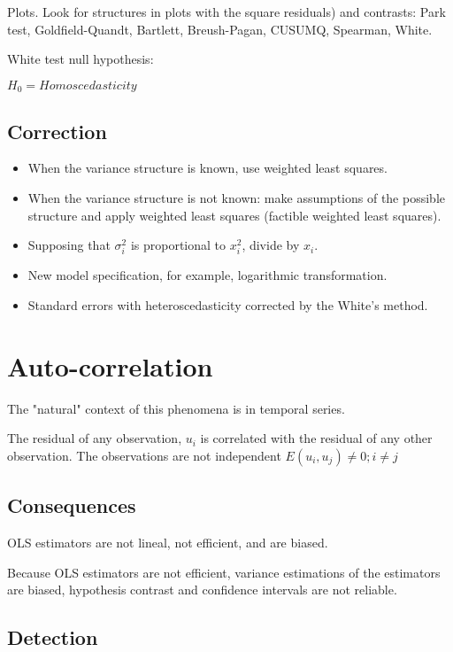 \documentclass[10pt, a4paper, landscape]{extarticle}
\begin{document}
\begin{multicols}{3}
Plots. Look for structures in plots with the square residuals) and contrasts: Park test, Goldfield-Quandt, Bartlett, Breush-Pagan, CUSUMQ, Spearman, White.

White test null hypothesis:

$H_0 = Homoscedasticity$

\subsection*{Correction}

\begin{itemize}[leftmargin=*]
\item When the variance structure is known, use weighted least squares.
\item When the variance structure is not known: make assumptions of the possible structure and apply weighted least squares (factible weighted least squares).
\item Supposing that $\sigma_i^2$ is proportional to $x_i^2$, divide by $x_i$.
\item New model specification, for example, logarithmic transformation.
\item Standard errors with heteroscedasticity corrected by the White's method.
\end{itemize}

\section*{Auto-correlation}

The "natural" context of this phenomena is in temporal series.

The residual of any observation, $u_i$ is correlated with the residual of any other observation. The observations are not independent $E(u_i,u_j) \neq 0; i \neq j$

\subsection*{Consequences}

OLS estimators are not lineal, not efficient, and are biased.

Because OLS estimators are not efficient, variance estimations of the estimators are biased, hypothesis contrast and confidence intervals are not reliable.

\subsection*{Detection}


\end{multicols}
\end{document}
